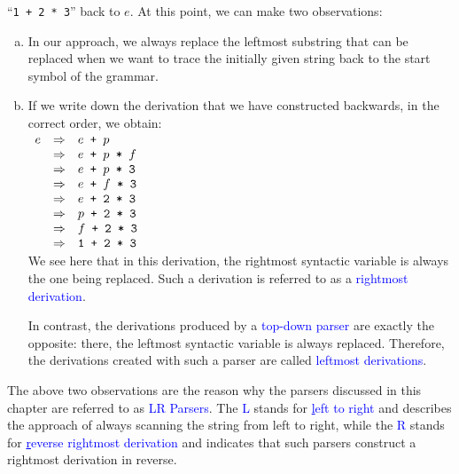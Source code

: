 ``\texttt{1 + 2 * 3}'' back to \(e\). At this point, we can make two observations: 
\begin{enumerate}[(a)]
\item In our approach, we always replace the leftmost substring that can be replaced when we want to trace the
      initially given string back to the start symbol of the grammar. 
\item If we write down the derivation that we have constructed backwards, in the correct order, we obtain:
\\[0.2cm]
\hspace*{1.3cm}
$
\begin{array}[t]{lcl}
e  & \Rightarrow & e \texttt{ + } p \\
   & \Rightarrow & e \texttt{ + } p \texttt{ * } f \\
   & \Rightarrow & e \texttt{ + } p \texttt{ * 3} \\
   & \Rightarrow & e \texttt{ + } f \texttt{ * 3} \\
   & \Rightarrow & e \texttt{ + 2 * 3} \\
   & \Rightarrow & p \texttt{ + 2 * 3} \\
   & \Rightarrow & f \texttt{ + 2 * 3} \\
   & \Rightarrow & \texttt{1 + 2 * 3}
\end{array}
$
   \\[0.2cm]
   We see here that in this derivation, the rightmost syntactic variable is always the one being replaced. Such
   a derivation is referred to as a \textcolor{blue}{rightmost derivation}. 

   In contrast, the derivations produced by a \textcolor{blue}{top-down parser} are exactly the opposite:
   there, the leftmost syntactic variable is always replaced. Therefore, the derivations created with such a
   parser are called \textcolor{blue}{leftmost derivations}. 
\end{enumerate}
The above two observations are the reason why the parsers discussed in this chapter are referred to as
\textcolor{blue}{LR Parsers}. The \textcolor{blue}{L} stands for \textcolor{blue}{\underline{l}eft to right}
and describes the approach of always scanning the string from left to right, while the \textcolor{blue}{R}
stands for \textcolor{blue}{\underline{r}everse rightmost derivation} and indicates that such parsers construct
a rightmost derivation in reverse. 
\vspace*{0.2cm}

